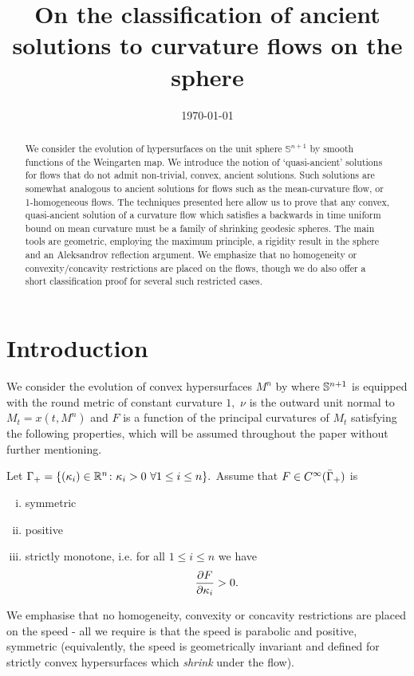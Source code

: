 \documentclass{amsart}
\begin{document}
\title[Ancient solutions to curvature flows in the sphere]
 {On the classification of ancient solutions to curvature flows on the sphere}

\curraddr{}
\email{}
\date{\today}

\dedicatory{}
\subjclass[2010]{}
\keywords{}

\begin{abstract}
We consider the evolution of hypersurfaces on the unit sphere $\mathbb{S}^{n+1}$ by smooth functions of the Weingarten map. We introduce the notion of `quasi-ancient' solutions for flows that do not admit non-trivial, convex, ancient solutions. Such solutions are somewhat analogous to ancient solutions for flows such as the mean-curvature flow, or 1-homogeneous flows. The techniques presented here allow us to prove that any convex, quasi-ancient solution of a curvature flow which satisfies a backwards in time uniform bound on mean curvature must be a family of shrinking geodesic spheres. The main tools are geometric, employing the maximum principle, a rigidity result in the sphere and an Aleksandrov reflection argument. We emphasize that no homogeneity or convexity/concavity restrictions are placed on the flows, though we do also offer a short classification proof for several such restricted cases.
\end{abstract}

\maketitle

\section{Introduction}
\label{sec:intro}

We consider the evolution of convex hypersurfaces $M^n$ by
where \(\S^{n+1}\) is equipped with the round metric of constant curvature $1,$ $\nu$ is the outward unit normal to $M_t=x(t,M^n)$ and $F$ is a function of the principal curvatures of $M_t$ satisfying the following properties, which will be assumed throughout the paper without further mentioning.
\begin{ass} \label{F}
Let $\G_{+}=\{(\k_i)\in\R^n\cn \k_i>0~\forall 1\leq i\leq n\}.$ Assume that $F\in C^{\8}(\-\G_{+})$ is
\begin{enumerate}[(i)]
\item{symmetric}
\item{positive}
\item{strictly monotone, i.e. for all $1\leq i\leq n$ we have
\[\fr{\del F}{\del \k_i}>0.\]}
\end{enumerate}
\end{ass}
We emphasise that no homogeneity, convexity or concavity restrictions are placed on the speed - all we require is that the speed is parabolic and positive, symmetric (equivalently, the speed is geometrically invariant and defined for strictly convex hypersurfaces which \emph{shrink} under the flow).
\end{document}
